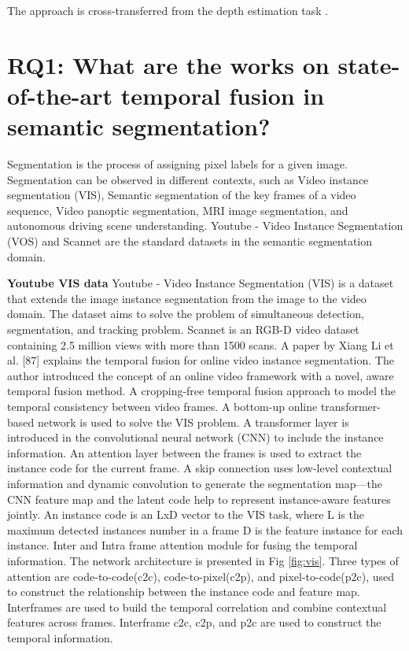     The approach is cross-transferred from the depth estimation task \cite{52_hou2019multi} \cite{03_duzceker2021deepvideomvs}. 
    
    \section{RQ1: What are the works on state-of-the-art temporal fusion in semantic segmentation?}
	
	Segmentation is the process of assigning pixel labels for a given image. Segmentation can be observed in different contexts, such as Video instance segmentation (VIS), Semantic segmentation of the key frames of a video sequence, Video panoptic segmentation, MRI image segmentation, and autonomous driving scene understanding. Youtube - Video Instance Segmentation (VOS) and Scannet are the standard datasets in the semantic segmentation domain. 

	{ \bf Youtube VIS data}
	Youtube - Video Instance Segmentation (VIS) is a dataset that extends the image instance segmentation from the image to the video domain. The dataset aims to solve the problem of simultaneous detection, segmentation, and tracking problem. Scannet is an RGB-D video dataset containing 2.5 million views with more than 1500 scans. 
	A paper by Xiang Li et al. [87] explains the temporal fusion for online video instance segmentation. The author introduced the concept of an online video framework with a novel, aware temporal fusion method. A cropping-free temporal fusion approach to model the temporal consistency between video frames. A bottom-up online transformer-based network is used to solve the VIS problem. A transformer layer is introduced in the convolutional neural network (CNN) to include the instance information. An attention layer between the frames is used to extract the instance code for the current frame. A skip connection uses low-level contextual information and dynamic convolution to generate the segmentation map—the CNN feature map and the latent code help to represent instance-aware features jointly. An instance code is an LxD vector to the VIS task, where L is the maximum detected instances number in a frame D is the feature instance for each instance. Inter and Intra frame attention module for fusing the temporal information. The network architecture is presented in Fig \ref{fig:vis}. Three types of attention are code-to-code(c2c), code-to-pixel(c2p), and pixel-to-code(p2c), used to construct the	relationship between the instance code and feature map. Interframes are used to build the temporal correlation and combine contextual features across frames. Interframe c2c, c2p, and p2c are used to construct the temporal information.	

